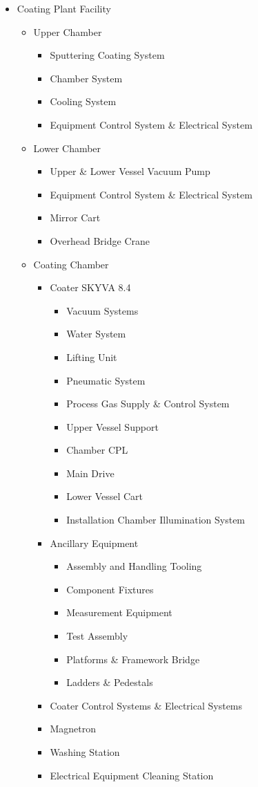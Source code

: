 \begin{small}
\begin{itemize}
	\item Coating Plant Facility
	\begin{itemize}
		\item Upper Chamber
			\begin{itemize}
			\item Sputtering Coating System
			\item Chamber System
			\item Cooling System
			\item Equipment Control System \& Electrical System
			\end{itemize}
		\item Lower Chamber
			\begin{itemize}
			\item Upper \& Lower Vessel Vacuum Pump
			\item Equipment Control System \& Electrical System
			\item Mirror Cart
			\item Overhead Bridge Crane
			\end{itemize}
		\item Coating Chamber
			\begin{itemize}
			\item Coater SKYVA 8.4
				\begin{itemize}
				\item Vacuum Systems
				\item Water System
				\item Lifting Unit
				\item Pneumatic System
				\item Process Gas Supply \& Control System
				\item Upper Vessel Support
				\item Chamber CPL
				\item Main Drive
				\item Lower Vessel Cart
				\item Installation Chamber Illumination System
				\end{itemize}
			\item Ancillary Equipment
				\begin{itemize}
				\item Assembly and Handling Tooling
				\item Component Fixtures
				\item Measurement Equipment
				\item Test Assembly
				\item Platforms \& Framework Bridge
				\item Ladders \& Pedestals
				\end{itemize}
			\item Coater Control Systems \& Electrical Systems
			\item Magnetron
			\item Washing Station
			\item Electrical Equipment Cleaning Station
			\end{itemize}
	\end{itemize}

\end{itemize}
\end{small}
